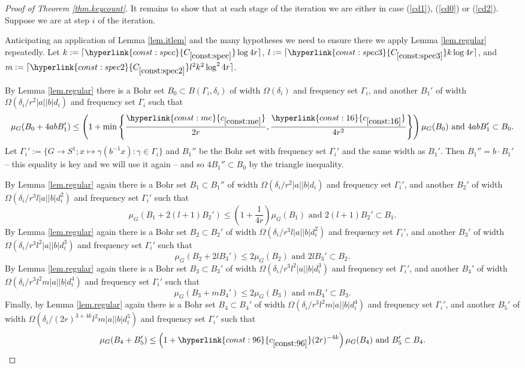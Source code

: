 \documentclass[12pt,reqno]{amsart}
\numberwithin{equation}{section}
\newcommand{\refconstlittle}[1]{%
    \hyperlink{const:#1}{c_{\ref{const:#1}}}%
}
\newcommand{\refconstbig}[1]{%
    \hyperlink{const:#1}{C_{\ref{const:#1}}}%
}
\begin{document}
\begin{proof}[Proof of Theorem \ref{thm.keycount}]
It remains to show that at each stage of the iteration we are either in case (\ref{cd1}), (\ref{cd0}) or (\ref{cd2}). Suppose we are at step $i$ of the iteration.

Anticipating an application of Lemma \ref{lem.itlem} and the many hypotheses we need to ensure there we apply Lemma \ref{lem.regular} repeatedly. Let $k :=\lceil \refconstbig{spec}\log 4r\rceil$, $l :=\lceil  \refconstbig{spec3}k \log 4r\rceil$, and  $m := \lceil \refconstbig{spec2}l^2k^2\log^24r\rceil$.

By Lemma \ref{lem.regular} there is a Bohr set $B_0 \subset B(\Gamma_i,\delta_i)$ of width $\Omega(\delta_i)$ and frequency set $\Gamma_i$, and another $B_1'$ of width $\Omega(\delta_i/r^2|a||b|d_i)$ and frequency set $\Gamma_i$ such that
\begin{equation*}
\mu_G(B_0+4abB_1')\leq \left(1+\min\left\{\frac{\refconstlittle{me}}{2r},\frac{\refconstlittle{16}}{4r^2}\right\}\right)\mu_G(B_0) \text{ and }4abB_1' \subset B_0.
\end{equation*}
Let $\Gamma_i':=\{G \rightarrow S^1; x \mapsto \gamma(b^{-1}x): \gamma \in \Gamma_i\}$ and $B_1''$ be the Bohr set with frequency set $\Gamma_i'$ and the same width as $B_1'$. Then $B_1''=b \cdot B_1'$ -- this equality is key and we will use it again -- and so $4B_1'' \subset B_0$ by the triangle inequality. 

By Lemma \ref{lem.regular} again there is a Bohr set $B_1\subset B_1''$ of width $\Omega(\delta_i/r^2|a||b|d_i)$ and frequency set $\Gamma_i'$, and another $B_2'$ of width $\Omega(\delta_i/r^3l|a||b|d_i^2)$ and frequency set $\Gamma_i'$ such that
\begin{equation}\label{eqn.b2size}
\mu_G(B_1+2(l+1)B_2')\leq \left(1+\frac{1}{4r}\right)\mu_G(B_1) \text{ and }2(l+1)B_2' \subset B_1.
\end{equation}
By Lemma \ref{lem.regular} again there is a Bohr set $B_2 \subset B_2'$ of width $\Omega(\delta_i/r^3l|a||b|d_i^2)$ and frequency set $\Gamma_i'$, and another $B_3'$ of width $\Omega(\delta_i/r^3l^2|a||b|d_i^3)$ and frequency set $\Gamma_i'$  such that
\begin{equation*}
\mu_G(B_2+2lB_3')\leq 2\mu_G(B_2) \text{ and }2lB_3' \subset B_2.
\end{equation*}
By Lemma \ref{lem.regular} again there is a Bohr set $B_3 \subset B_3'$ of width $\Omega(\delta_i/r^3l^2|a||b|d_i^3)$ and frequency set $\Gamma_i'$, and another $B_4'$ of width $\Omega(\delta_i/r^3l^2m|a||b|d_i^4)$ and frequency set $\Gamma_i'$  such that
\begin{equation*}
\mu_G(B_3+mB_4')\leq 2\mu_G(B_3) \text{ and } mB_4' \subset B_3.
\end{equation*}
Finally, by Lemma \ref{lem.regular} again there is a Bohr set $B_4 \subset B_4'$ of width $\Omega(\delta_i/r^3l^2m|a||b|d_i^4)$ and frequency set $\Gamma_i'$, and another $B_5'$ of width $\Omega(\delta_i/(2r)^{3+4k}l^2m|a||b|d_i^5)$ and frequency set $\Gamma_i'$  such that
\begin{equation*}
\mu_G(B_4+B_5')\leq \left(1+\refconstlittle{96}(2r)^{-4k}\right)\mu_G(B_4) \text{ and } B_5' \subset B_4.
\end{equation*}


\end{proof}
\end{document}
